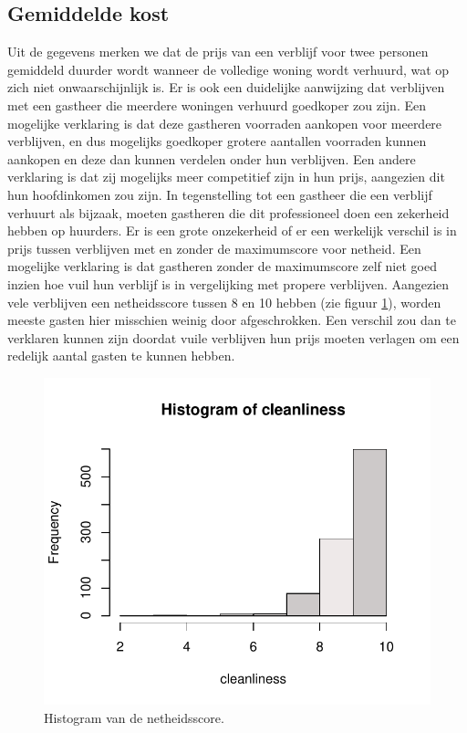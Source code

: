 \documentclass[a4paper]{kulakarticle}
\begin{document}
	\subsection{Gemiddelde kost}
	
	Uit de gegevens merken we dat de prijs van een verblijf voor twee personen gemiddeld duurder wordt wanneer de volledige woning wordt verhuurd, wat op zich niet onwaarschijnlijk is.
	Er is ook een duidelijke aanwijzing dat verblijven met een gastheer die meerdere woningen verhuurd goedkoper zou zijn. Een mogelijke verklaring is dat deze gastheren voorraden aankopen voor meerdere verblijven, en dus mogelijks goedkoper grotere aantallen voorraden kunnen aankopen en deze dan kunnen verdelen onder hun verblijven. Een andere verklaring is dat zij mogelijks meer competitief zijn in hun prijs, aangezien dit hun hoofdinkomen zou zijn. In tegenstelling tot een gastheer die een verblijf verhuurt als bijzaak, moeten gastheren die dit professioneel doen een zekerheid hebben op huurders.
	Er is een grote onzekerheid of er een werkelijk verschil is in prijs tussen verblijven met en zonder de maximumscore voor netheid. Een mogelijke verklaring is dat gastheren zonder de maximumscore zelf niet goed inzien hoe vuil hun verblijf is in vergelijking met propere verblijven. Aangezien vele verblijven een netheidsscore tussen 8 en 10 hebben (zie figuur \ref{fig:cleanliness}), worden meeste gasten hier misschien weinig door afgeschrokken. Een verschil zou dan te verklaren kunnen zijn doordat vuile verblijven hun prijs moeten verlagen om een redelijk aantal gasten te kunnen hebben.
	
	\begin{figure}
		\centering
		\includegraphics{Figuren/cleanliness_hist.pdf}
		\caption{Histogram van de netheidsscore.}
		\label{fig:cleanliness}
	\end{figure}
	
\end{document}
